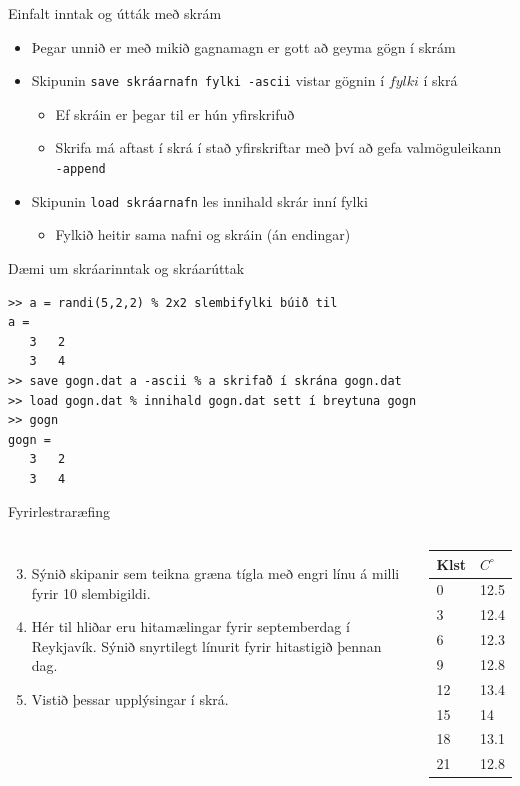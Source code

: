 \documentclass[handout]{beamer}
\begin{document}
\begin{frame}{Einfalt inntak og útták með skrám}
\begin{itemize}
 \item Þegar unnið er með mikið gagnamagn er gott að geyma gögn í skrám
 \item Skipunin \texttt{save skráarnafn fylki -ascii} vistar gögnin í $fylki$ í skrá
 \begin{itemize}
  \item Ef skráin er þegar til er hún yfirskrifuð
  \item Skrifa má aftast í skrá í stað yfirskriftar með því að gefa valmöguleikann \texttt{-append}
 \end{itemize}
 \item Skipunin \texttt{load skráarnafn} les innihald skrár inní fylki
  \begin{itemize}
   \item Fylkið heitir sama nafni og skráin (án endingar)
  \end{itemize}
 \end{itemize}
\end{frame}

\begin{frame}[fragile]{Dæmi um skráarinntak og skráarúttak}
\begin{verbatim}
>> a = randi(5,2,2) % 2x2 slembifylki búið til
a =
   3   2
   3   4
>> save gogn.dat a -ascii % a skrifað í skrána gogn.dat
>> load gogn.dat % innihald gogn.dat sett í breytuna gogn
>> gogn
gogn =
   3   2
   3   4
\end{verbatim}
\end{frame}

\begin{frame}{Fyrirlestraræfing}
\begin{columns}
    \begin{enumerate}
    \setcounter{enumi}{2}
     \item Sýnið skipanir sem teikna græna tígla með engri línu á milli fyrir 10 slembigildi.
     \item Hér til hliðar eru hitamælingar fyrir septemberdag í Reykjavík. Sýnið snyrtilegt línurit fyrir hitastigið þennan dag.
     \item Vistið þessar upplýsingar í skrá.
    \end{enumerate}
    \begin{center}
    \begin{tabular}{ll}
    \toprule
    Klst&$C^\circ$\\
    \midrule
    0&12.5\\
    3&12.4\\
    6&12.3\\
    9&12.8\\
    12&13.4\\
    15&14\\
    18&13.1\\
    21&12.8\\
    \bottomrule
    \end{tabular}
    \end{center}
\end{columns}
    
\end{frame}
\end{document}

